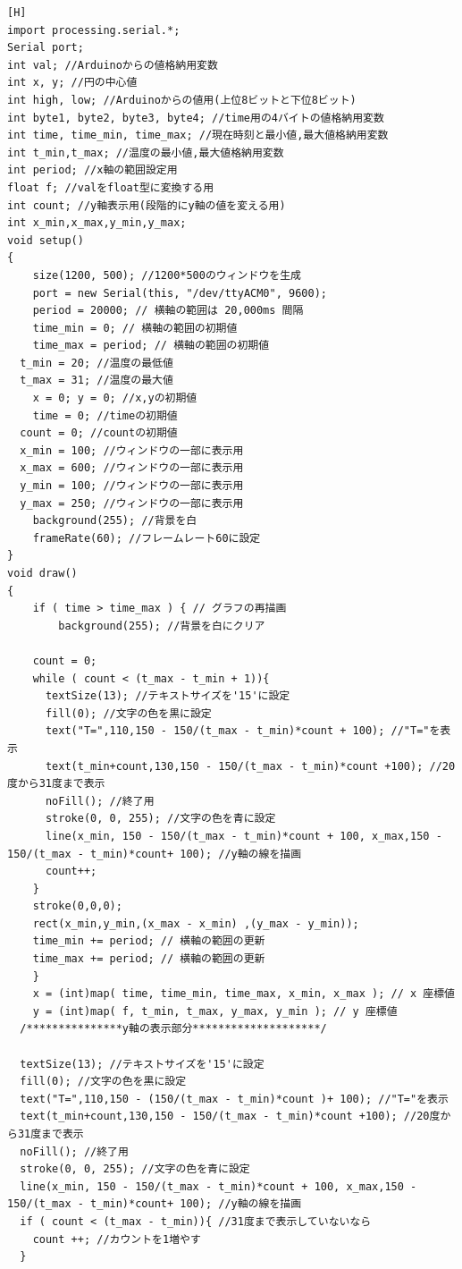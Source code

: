 \documentclass{jarticle}
\begin{document}
\begin{lstlisting}[caption = 課題3.2.3(Processing),label=code:kadai3-2-3-p][H]
import processing.serial.*;
Serial port;
int val; //Arduinoからの値格納用変数
int x, y; //円の中心値
int high, low; //Arduinoからの値用(上位8ビットと下位8ビット)
int byte1, byte2, byte3, byte4; //time用の4バイトの値格納用変数
int time, time_min, time_max; //現在時刻と最小値,最大値格納用変数
int t_min,t_max; //温度の最小値,最大値格納用変数
int period; //x軸の範囲設定用
float f; //valをfloat型に変換する用
int count; //y軸表示用(段階的にy軸の値を変える用)
int x_min,x_max,y_min,y_max;
void setup()
{
	size(1200, 500); //1200*500のウィンドウを生成
	port = new Serial(this, "/dev/ttyACM0", 9600);
	period = 20000; // 横軸の範囲は 20,000ms 間隔
	time_min = 0; // 横軸の範囲の初期値
	time_max = period; // 横軸の範囲の初期値
  t_min = 20; //温度の最低値
  t_max = 31; //温度の最大値
	x = 0; y = 0; //x,yの初期値
	time = 0; //timeの初期値
  count = 0; //countの初期値
  x_min = 100; //ウィンドウの一部に表示用
  x_max = 600; //ウィンドウの一部に表示用
  y_min = 100; //ウィンドウの一部に表示用
  y_max = 250; //ウィンドウの一部に表示用
	background(255); //背景を白
	frameRate(60); //フレームレート60に設定
}
void draw()
{
	if ( time > time_max ) { // グラフの再描画
		background(255); //背景を白にクリア
    
    count = 0;
    while ( count < (t_max - t_min + 1)){
      textSize(13); //テキストサイズを'15'に設定
      fill(0); //文字の色を黒に設定
      text("T=",110,150 - 150/(t_max - t_min)*count + 100); //"T="を表示
      text(t_min+count,130,150 - 150/(t_max - t_min)*count +100); //20度から31度まで表示
      noFill(); //終了用
      stroke(0, 0, 255); //文字の色を青に設定
      line(x_min, 150 - 150/(t_max - t_min)*count + 100, x_max,150 - 150/(t_max - t_min)*count+ 100); //y軸の線を描画
      count++;
    }
    stroke(0,0,0);
    rect(x_min,y_min,(x_max - x_min) ,(y_max - y_min));
    time_min += period; // 横軸の範囲の更新
    time_max += period; // 横軸の範囲の更新
	}
	x = (int)map( time, time_min, time_max, x_min, x_max ); // x 座標値
	y = (int)map( f, t_min, t_max, y_max, y_min ); // y 座標値
  /***************y軸の表示部分********************/
  
  textSize(13); //テキストサイズを'15'に設定
  fill(0); //文字の色を黒に設定
  text("T=",110,150 - (150/(t_max - t_min)*count )+ 100); //"T="を表示
  text(t_min+count,130,150 - 150/(t_max - t_min)*count +100); //20度から31度まで表示
  noFill(); //終了用
  stroke(0, 0, 255); //文字の色を青に設定
  line(x_min, 150 - 150/(t_max - t_min)*count + 100, x_max,150 - 150/(t_max - t_min)*count+ 100); //y軸の線を描画
  if ( count < (t_max - t_min)){ //31度まで表示していないなら
    count ++; //カウントを1増やす
  }
  

\end{lstlisting}
\end{document}
